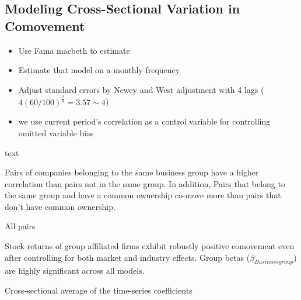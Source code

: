 \documentclass[12pt, a4paper]{article}
\begin{document}
\FloatBarrier
\subsection{Modeling Cross-Sectional Variation in Comovement}




\begin{itemize}
\item Use Fama macbeth to estimate 

\item Estimate that model on a monthly frequency 
\item Adjust standard errors by Newey and West adjustment with 4 lags ($ 4(60/100)^{\frac{2}{9}} = 3.57 \sim 4 $)
\item we use current period's correlation as a control variable for controlling omitted variable bias
\end{itemize}


\begin{table}[htbp]
\centering
\caption{text}
\label{mresult2}
    \resizebox{1\textwidth}{!}{

}
\end{table}

Pairs of companies belonging to the same business group have a higher correlation than pairs not in the same group. In addition, Pairs that belong to the same group and have a common ownership co-move more than pairs that don't have common ownership. 


		\begin{table}[htbp]
	\centering
	\caption{All pairs}
%		
\label{AllPairs}
	\resizebox{\textwidth}{!}{
		
	}
\end{table}

\FloatBarrier

Stock returns of group affiliated firms exhibit robustly positive comovement even after controlling for both market and industry effects. Group betas
($ \beta_{Businussgroup} $) are highly significant across all models.

\begin{table}[htbp]
	\centering
	\caption{Cross-sectional average of the time-series coefficients}
	\resizebox{\textwidth}{!}{
		
	}
\end{table}

\FloatBarrier
\end{document}
